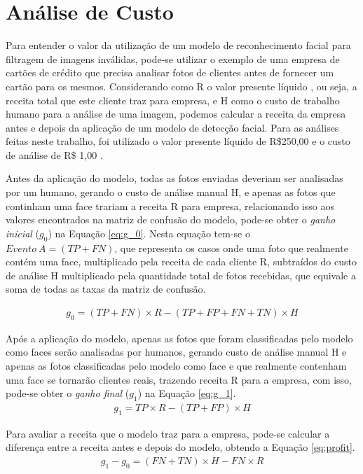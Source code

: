 \section{Análise de Custo}

Para entender o valor da utilização de um modelo de reconhecimento facial para filtragem de imagens inválidas, pode-se utilizar o exemplo de uma empresa de cartões de crédito que precisa analisar fotos de clientes antes de fornecer um cartão para os mesmos. Considerando como R o valor presente líquido \cite{npv-article}, ou seja, a receita total que este cliente traz para empresa, e H como o custo de trabalho humano para a análise de uma imagem, podemos calcular a receita da empresa antes e depois da aplicação de um modelo de detecção facial. Para as análises feitas neste trabalho, foi utilizado o valor presente líquido de R\$250,00 e o custo de análise de R\$ 1,00 \cite{hussain2007valuationnpv}.

Antes da aplicação do modelo, todas as fotos enviadas deveriam ser analisadas por um humano, gerando o custo de análise manual H, e apenas as fotos que continham uma face trariam a receita R para empresa, relacionando isso aos valores encontrados na matriz de confusão do modelo, pode-se obter o \textit{ganho inicial} ($g_0$) na Equação \ref{eq:g_0}. Nesta equação tem-se o $Evento\:A = (TP + FN)$, que representa os casos onde uma foto que realmente contém uma face, multiplicado pela receita de cada cliente R, subtraídos do custo de análise H multiplicado pela quantidade total de fotos recebidas, que equivale a soma de todas as taxas da matriz de confusão.

\begin{align} \label{eq:g_0}
    g_0 = (TP+FN) \times R - (TP+FP+FN+TN) \times H
\end{align}

Após a aplicação do modelo, apenas as fotos que foram classificadas pelo modelo como faces serão analisadas por humanos, gerando custo de análise manual H e apenas as fotos classificadas pelo modelo como face e que realmente contenham uma face se tornarão clientes reais, trazendo receita R para a empresa, com isso, pode-se obter o \textit{ganho final} ($g_1$) na Equação \ref{eq:g_1}.
\begin{align} \label{eq:g_1}
    g_1 = TP \times R - (TP+FP) \times H
\end{align}

Para avaliar a receita que o modelo traz para a empresa, pode-se calcular a diferença entre a receita antes e depois do modelo, obtendo a Equação \ref{eq:profit}.
\begin{align} \label{eq:profit}
    g_1 - g_0 = (FN + TN) \times H - FN \times R
\end{align}

